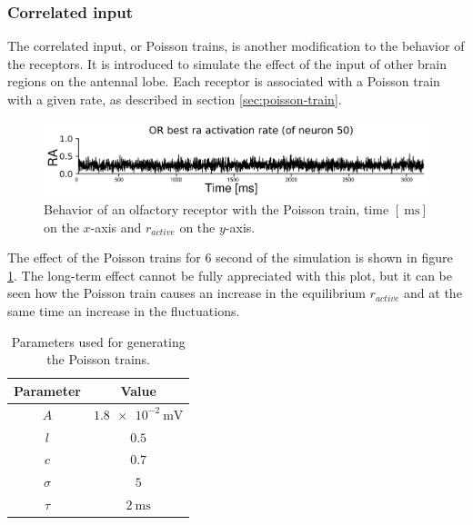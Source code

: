     \subsubsection{Correlated input}
    \label{sec:finding-poisson-train}
    The correlated input, or Poisson trains, is another modification to the behavior of the receptors.
    It is introduced to simulate the effect of the input of other brain regions on the antennal lobe.
    Each receptor is associated with a Poisson train with a given rate, as described in section \ref{sec:poisson-train}.

    \begin{figure}
      \centering
      \includegraphics[width=\textwidth]{or_activation_with_poisson}
      \caption{Behavior of an olfactory receptor with the Poisson train, time $[\SI{}{\milli\second}]$ on the $x$-axis and $r_{active}$ on the $y$-axis.}
      \label{fig:receptors_poisson}
    \end{figure}

    The effect of the Poisson trains for $6$ second of the simulation is shown in figure \ref{fig:receptors_poisson}.
    The long-term effect cannot be fully appreciated with this plot, but it can be seen how the Poisson train causes an increase in the equilibrium $r_{active}$ and at the same time an increase in the fluctuations.\\

    \begin{table}
      \centering
      \begin{tabular}{ c c }
        \hline
        Parameter & Value \\
        \hline
        $A$ & $\SI{1.8e-2}{\milli\volt}$ \\
        $l$ & $0.5$ \\
        $c$ & $0.7$ \\
        $\sigma$ & $5$ \\
        $\tau$ & $\SI{2}{\milli\second}$ \\
        \hline
      \end{tabular}
      \caption{Parameters used for generating the Poisson trains.}
      \label{tab:poisson-params}
    \end{table}

